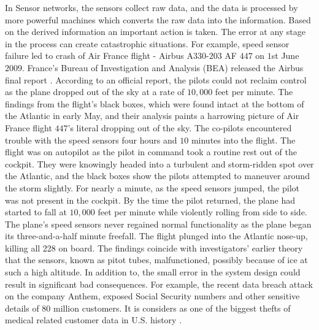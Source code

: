 	In Sensor networks, the sensors collect raw data, and the data is processed by more powerful machines which converts the raw data into the information.
	Based on the derived information an important action is taken.
	The error at any stage in the process can create catastrophic situations.
	For example, speed sensor failure led to crash of Air France flight - Airbus A$330$-$203$ AF $447$ on $1$st June $2009$.
	France's Bureau of Investigation and Analysis (BEA) released the Airbus final report \cite{final-report}.
	According to an official report, the pilots could not reclaim control as the plane dropped out of the sky at a rate of $10,000$ feet per minute.
	The findings from the flight's black boxes, which were found intact at the bottom of the Atlantic in early May, and their analysis paints a harrowing picture of Air France flight $447$'s literal dropping out of the sky.
	The co-pilots encountered trouble with the speed sensors four hours and $10$ minutes into the flight. 
	The flight was on autopilot as the pilot in command took a routine rest out of the cockpit. 
	They were knowingly headed into a turbulent and storm-ridden spot over the Atlantic, and the black boxes show the pilots attempted to maneuver around the storm slightly.
	For nearly a minute, as the speed sensors jumped, the pilot was not present in the cockpit. 
	By the time the pilot returned, the plane had started to fall at $10,000$ feet per minute while violently rolling from side to side.
	The plane's speed sensors never regained normal functionality as the plane began its three-and-a-half minute freefall.
	The flight plunged into the Atlantic nose-up, killing all 228 on board.
	The findings coincide with investigators' earlier theory that the sensors, known as pitot tubes, malfunctioned, possibly because of ice at such a high altitude.
	In addition to, the small error in the system design could result in significant bad consequences.
	For example, the recent data breach attack on the company Anthem, exposed Social Security numbers and other sensitive details of 80 million customers.
	It is considers as one of the biggest thefts of medical related customer data in U.S. history \cite{anthem}.

